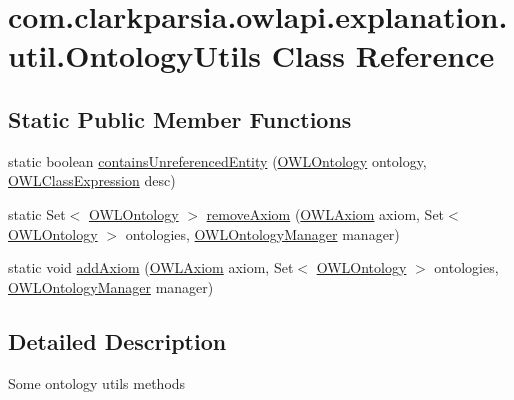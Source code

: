 \hypertarget{classcom_1_1clarkparsia_1_1owlapi_1_1explanation_1_1util_1_1_ontology_utils}{\section{com.\-clarkparsia.\-owlapi.\-explanation.\-util.\-Ontology\-Utils Class Reference}
\label{classcom_1_1clarkparsia_1_1owlapi_1_1explanation_1_1util_1_1_ontology_utils}
}
\subsection*{Static Public Member Functions}
\begin{DoxyCompactItemize}
\item 
static boolean \hyperlink{classcom_1_1clarkparsia_1_1owlapi_1_1explanation_1_1util_1_1_ontology_utils_a3d0154083e3e586b3451a23a63b21bf8}{contains\-Unreferenced\-Entity} (\hyperlink{interfaceorg_1_1semanticweb_1_1owlapi_1_1model_1_1_o_w_l_ontology}{O\-W\-L\-Ontology} ontology, \hyperlink{interfaceorg_1_1semanticweb_1_1owlapi_1_1model_1_1_o_w_l_class_expression}{O\-W\-L\-Class\-Expression} desc)
\item 
static Set$<$ \hyperlink{interfaceorg_1_1semanticweb_1_1owlapi_1_1model_1_1_o_w_l_ontology}{O\-W\-L\-Ontology} $>$ \hyperlink{classcom_1_1clarkparsia_1_1owlapi_1_1explanation_1_1util_1_1_ontology_utils_a9e5183b0cc5b833b5905eb37a7c0d483}{remove\-Axiom} (\hyperlink{interfaceorg_1_1semanticweb_1_1owlapi_1_1model_1_1_o_w_l_axiom}{O\-W\-L\-Axiom} axiom, Set$<$ \hyperlink{interfaceorg_1_1semanticweb_1_1owlapi_1_1model_1_1_o_w_l_ontology}{O\-W\-L\-Ontology} $>$ ontologies, \hyperlink{interfaceorg_1_1semanticweb_1_1owlapi_1_1model_1_1_o_w_l_ontology_manager}{O\-W\-L\-Ontology\-Manager} manager)
\item 
static void \hyperlink{classcom_1_1clarkparsia_1_1owlapi_1_1explanation_1_1util_1_1_ontology_utils_a35cf33fdfb5b419c0f4c4f61cc485a8c}{add\-Axiom} (\hyperlink{interfaceorg_1_1semanticweb_1_1owlapi_1_1model_1_1_o_w_l_axiom}{O\-W\-L\-Axiom} axiom, Set$<$ \hyperlink{interfaceorg_1_1semanticweb_1_1owlapi_1_1model_1_1_o_w_l_ontology}{O\-W\-L\-Ontology} $>$ ontologies, \hyperlink{interfaceorg_1_1semanticweb_1_1owlapi_1_1model_1_1_o_w_l_ontology_manager}{O\-W\-L\-Ontology\-Manager} manager)
\end{DoxyCompactItemize}


\subsection{Detailed Description}
Some ontology utils methods 

